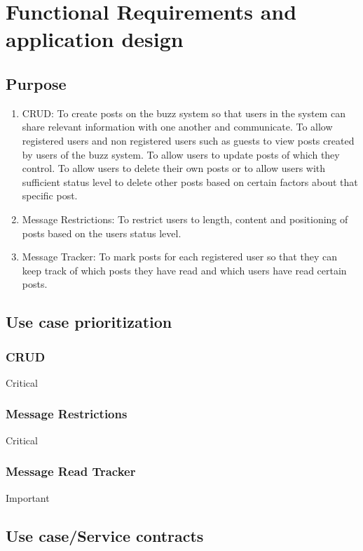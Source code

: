 \documentclass[12pt, oneside]{book}
\begin{document}
\section{Functional Requirements and application design}

\subsection{Purpose}
\begin{enumerate}
 \item{CRUD}: To create posts on the buzz system so that users in the system can share relevant information with one another and communicate. To allow registered users and non registered users such as guests to view posts created by users of the buzz system. To allow users to update posts of which they control. To allow users to delete their own posts or to allow users with sufficient status level to delete other posts based on certain factors about that specific post.
 \\
\item{Message Restrictions}: To restrict users to length, content and positioning of posts based on the users status level. 
\\
 \item{Message Tracker}: To mark posts for each registered user so that they can keep track of which posts they have read and which users have read certain posts.
\\

 
\end{enumerate}

\subsection{Use case prioritization}
\subsubsection{CRUD}
Critical
\subsubsection{Message Restrictions}
Critical
\subsubsection{Message Read Tracker}
Important
\subsection{Use case/Service contracts}
\end{document}
